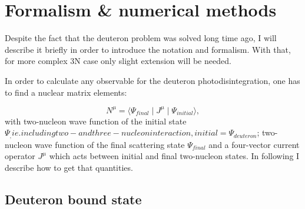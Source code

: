 \chapter{Formalism \& numerical methods}
\label{sec:formalism}

Despite the fact that the deuteron problem was solved long time ago, I will describe it briefly 
in order to introduce the notation and formalism. 
With that, for more complex 3N case only slight 
extension will be needed.

In order to calculate any observable for the deuteron photodisintegration,
one has to find a nuclear matrix elements:

\begin{equation}
    N^\mu = \langle \Psi_{final} \mid J^\mu \mid \Psi_{initial} \rangle, 
    \label{main}
\end{equation}
with two-nucleon wave function of the initial state $\Psi_,
ie. including two- and three- nucleon interaction,{initial}  = \Psi_{deuteron}$;
two-nucleon wave function of the final scattering state $\Psi_{final}$ 
and a four-vector current operator $J^\mu$ which acts between initial and final 
two-nucleon states. In following I describe how to get that quantities.




\section{Deuteron bound state}
    \label{sec:deut_bound}

